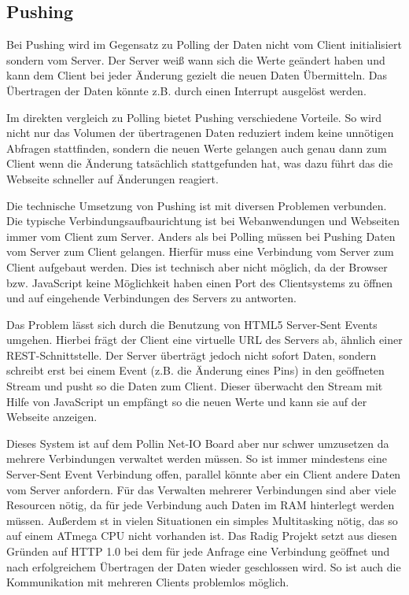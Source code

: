 \subsection{Pushing}
Bei Pushing wird im Gegensatz zu Polling der Daten nicht vom Client initialisiert sondern 
vom Server. Der Server weiß wann sich die Werte geändert haben und kann dem Client bei 
jeder Änderung gezielt die neuen Daten Übermitteln. Das Übertragen der Daten könnte z.B. 
durch einen Interrupt ausgelöst werden.

Im direkten vergleich zu Polling bietet Pushing verschiedene Vorteile. So wird nicht nur 
das Volumen der übertragenen Daten reduziert indem keine unnötigen Abfragen stattfinden,
sondern die neuen Werte gelangen auch genau dann zum Client wenn die Änderung tatsächlich 
stattgefunden hat, was dazu führt das die Webseite schneller auf Änderungen reagiert.

Die technische Umsetzung von Pushing ist mit diversen Problemen verbunden. Die typische 
Verbindungsaufbaurichtung ist bei Webanwendungen und Webseiten immer vom Client zum 
Server. Anders als bei Polling müssen bei Pushing Daten vom Server zum Client gelangen. 
Hierfür muss eine Verbindung vom Server zum Client aufgebaut werden. Dies ist technisch 
aber nicht möglich, da der Browser bzw. JavaScript keine Möglichkeit haben einen Port des 
Clientsystems zu öffnen und auf eingehende Verbindungen des Servers zu antworten. 

Das Problem lässt sich durch die Benutzung von HTML5 Server-Sent Events umgehen. Hierbei 
frägt der Client eine virtuelle URL des Servers ab, ähnlich einer REST-Schnittstelle. Der 
Server überträgt jedoch nicht sofort Daten, sondern schreibt erst bei einem Event (z.B. 
die Änderung eines Pins) in den geöffneten Stream und pusht so die Daten zum Client. 
Dieser überwacht den Stream mit Hilfe von JavaScript un empfängt so die neuen Werte und 
kann sie auf der Webseite anzeigen.

Dieses System ist auf dem Pollin Net-IO Board aber nur schwer umzusetzen da mehrere 
Verbindungen verwaltet werden müssen. So ist immer mindestens eine Server-Sent Event 
Verbindung offen, parallel könnte aber ein Client andere Daten vom Server anfordern. Für 
das Verwalten mehrerer Verbindungen sind aber viele Resourcen nötig, da für jede 
Verbindung auch Daten im RAM hinterlegt werden müssen. Außerdem st in vielen Situationen 
ein simples Multitasking nötig, das so auf einem ATmega CPU nicht vorhanden ist. Das Radig 
Projekt setzt aus diesen Gründen auf HTTP 1.0 bei dem für jede Anfrage eine Verbindung 
geöffnet und nach erfolgreichem Übertragen der Daten wieder geschlossen wird. So ist auch 
die Kommunikation mit mehreren Clients problemlos möglich.

